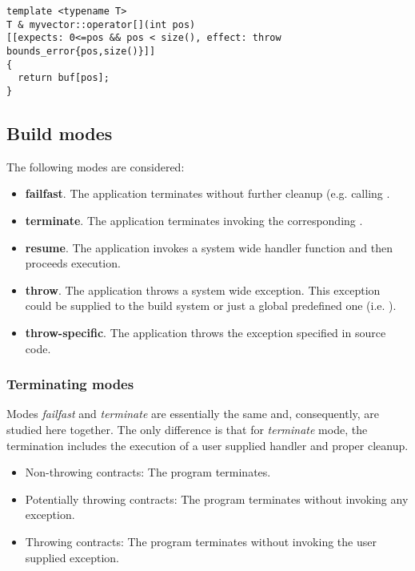 \begin{lstlisting}
template <typename T>
T & myvector::operator[](int pos) 
[[expects: 0<=pos && pos < size(), effect: throw bounds_error{pos,size()}]]
{
  return buf[pos];
}
\end{lstlisting}

\subsection {Build modes}

The following modes are considered:

\begin{itemize}
  \item \textbf{failfast}. The application terminates without further cleanup
(e.g. calling .
  \item \textbf{terminate}. The application terminates invoking the
corresponding .
  \item \textbf{resume}. The application invokes a system wide handler function
and then proceeds execution.
  \item \textbf{throw}. The application throws a system wide exception. This
exception could be supplied to the build system or just a global predefined one
(i.e. ).
  \item \textbf{throw-specific}. The application throws the exception specified
in source code.
\end{itemize}

\subsubsection{Terminating modes}

Modes \emph{failfast} and \emph{terminate} are essentially the same and,
consequently, are studied here together. The only difference is that for
\emph{terminate} mode, the termination includes the execution of a user supplied
handler and proper cleanup.

\begin{itemize}
  \item Non-throwing contracts: The program terminates.
  \item Potentially throwing contracts: The program terminates without invoking
any exception.
  \item Throwing contracts: The program terminates without invoking the user
supplied exception.
\end{itemize}

